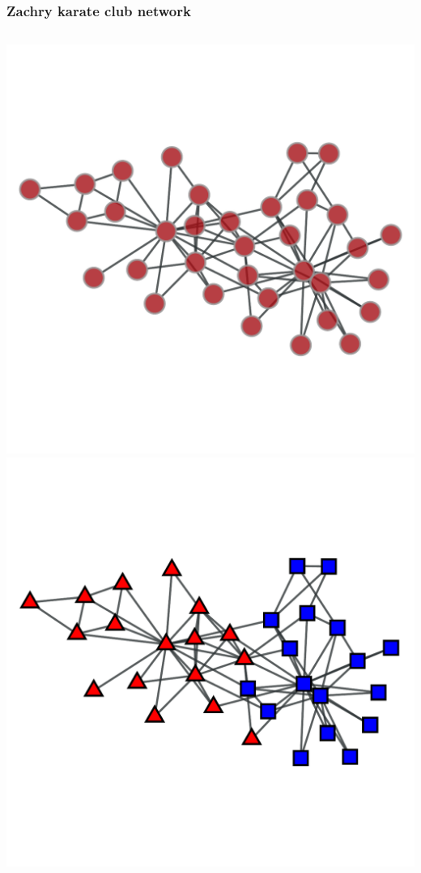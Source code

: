 \documentclass{beamer}
\begin{document}
\begin{frame}
    \frametitle{Zachry karate club network}
    \note{}
    \begin{columns}
    \centering
    \includegraphics[width=0.8\columnwidth]{karate_raw.pdf}
        \includegraphics[width=\columnwidth]{karate_actual.pdf}
    \end{columns}
\end{frame}
\end{document}
